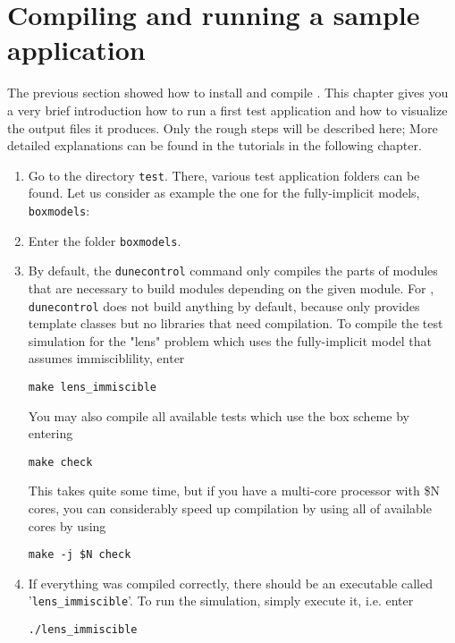 \section[Quick start guide]{Compiling and running a sample application}
\label{quick-start-guide}

The previous section showed how to install and compile \eWoms. This
chapter gives you a very brief introduction how to run a first test
application and how to visualize the output files it produces. Only the
rough steps will be described here; More detailed explanations can be
found in the tutorials in the following chapter.

\begin{enumerate}
\item Go to the directory \texttt{test}. There, various test
  application folders can be found. Let us consider as example
  the one for the fully-implicit models, \texttt{boxmodels}:
\item Enter the folder \texttt{boxmodels}.
\item By default, the \texttt{dunecontrol} command only compiles the
  parts of \Dune modules that are necessary to build modules depending
  on the given module. For \eWoms, \texttt{dunecontrol} does not build
  anything by default, because \eWoms only provides \Cplusplus
  template classes but no libraries that need compilation. To compile
  the test simulation for the "lens" problem which uses the fully-implicit
  model that assumes immisciblility, enter
\begin{lstlisting}[style=Bash]
make lens_immiscible
\end{lstlisting}

You may also compile all available tests which use the box scheme by entering
\begin{lstlisting}[style=Bash]
make check
\end{lstlisting}

This takes quite some time, but if you have a multi-core processor
with \$N cores, you can considerably speed up compilation by using all
of available cores by using
\begin{lstlisting}[style=Bash]
make -j $N check
\end{lstlisting}

\item If everything was compiled correctly, there should be an
  executable called '\texttt{lens{\_}immiscible}'. To run the simulation,
  simply execute it, i.e. enter
\begin{lstlisting}[style=Bash]
./lens_immiscible
\end{lstlisting}


\end{enumerate}
